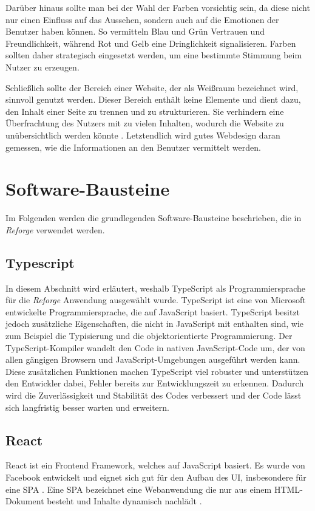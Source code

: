 Darüber hinaus sollte man bei der Wahl der Farben vorsichtig sein, da diese nicht nur einen Einfluss auf das Aussehen, sondern auch auf die Emotionen der Benutzer haben können. So vermitteln Blau und Grün Vertrauen und Freundlichkeit, während Rot und Gelb eine Dringlichkeit signalisieren. Farben sollten daher strategisch eingesetzt werden, um eine bestimmte Stimmung beim Nutzer zu erzeugen. \cite{bartel2013farben}

Schließlich sollte der Bereich einer Website, der als Weißraum bezeichnet wird, sinnvoll genutzt werden. Dieser Bereich enthält keine Elemente und dient dazu, den Inhalt einer Seite zu trennen und zu strukturieren. Sie verhindern eine Überfrachtung des Nutzers mit zu vielen Inhalten, wodurch die Website zu unübersichtlich werden könnte \cite{beaird2020principles}. Letztendlich wird gutes Webdesign daran gemessen, wie die Informationen an den Benutzer vermittelt werden. 

\section{Software-Bausteine}
Im Folgenden werden die grundlegenden Software-Bausteine beschrieben, die in \textit{Reforge} verwendet werden.

\subsection{Typescript}
In diesem Abschnitt wird erläutert, weshalb TypeScript als Programmiersprache für die \textit{Reforge} Anwendung ausgewählt wurde. TypeScript ist eine von Microsoft entwickelte Programmiersprache, die auf JavaScript basiert. TypeScript besitzt jedoch zusätzliche Eigenschaften, die nicht in JavaScript mit enthalten sind, wie zum Beispiel die Typisierung und die objektorientierte Programmierung. Der TypeScript-Kompiler wandelt den Code in nativen JavaScript-Code um, der von allen gängigen Browsern und JavaScript-Umgebungen ausgeführt werden kann. Diese zusätzlichen Funktionen machen TypeScript viel robuster und unterstützen den Entwickler dabei, Fehler bereits zur Entwicklungszeit zu erkennen. Dadurch wird die Zuverlässigkeit und Stabilität des Codes verbessert und der Code lässt sich langfristig besser warten und erweitern. \cite{Japikse2020}

\subsection{React}
React ist ein Frontend Framework, welches auf JavaScript basiert. Es wurde von Facebook entwickelt und eignet sich gut für den Aufbau des \ac{UI}, insbesondere für eine \ac{SPA} \cite{lazuardy2022modern}.  Eine \ac{SPA} bezeichnet eine Webanwendung die nur aus einem \ac{HTML}-Dokument besteht und Inhalte dynamisch nachlädt \cite{fink2014introducing}.

